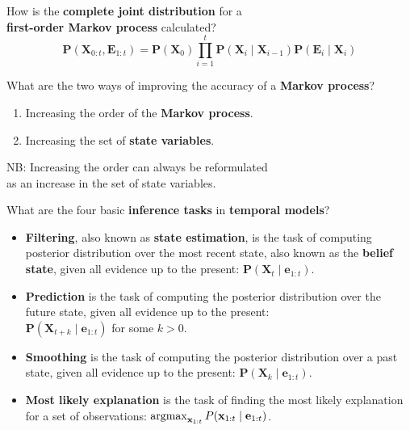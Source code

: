 \begin{flashcard}[Question]{How is the \textbf{complete joint distribution} for a\\\textbf{first-order Markov process} calculated?}
\begin{displaymath}
\mathbf{P}(\mathbf{X}_{0:t}, \mathbf{E}_{1:t}) = \mathbf{P}(\mathbf{X}_0) \prod_{i = 1}^t \mathbf{P}(\mathbf{X}_i \mid \mathbf{X}_{i - 1}) \mathbf{P}(\mathbf{E}_i \mid \mathbf{X}_i)
\end{displaymath}
\end{flashcard}

\begin{flashcard}[Question]{What are the two ways of improving the accuracy of a \textbf{Markov process}?}
\begin{center}
\begin{enumerate}[label=\arabic*.]
\item Increasing the order of the \textbf{Markov process}.
\item Increasing the set of \textbf{state variables}.
\end{enumerate}

\bigskip

NB: Increasing the order can always be reformulated\\as an increase in the set of state variables.
\end{center}
\end{flashcard}

\begin{flashcard}[Question]{What are the four basic \textbf{inference tasks} in \textbf{temporal models}?}
\begin{center}
\begin{itemize}
\item \textbf{Filtering}, also known as \textbf{state estimation}, is the task of computing posterior distribution over the most recent state, also known as the \textbf{belief state}, given all evidence up to the present: $\mathbf{P}(\mathbf{X}_t \mid \mathbf{e}_{1:t})$.
\item \textbf{Prediction} is the task of computing the posterior distribution over the future state, given all evidence up to the present:\\$\mathbf{P}(\mathbf{X}_{t + k} \mid \mathbf{e}_{1:t})$ for some $k > 0$.
\item \textbf{Smoothing} is the task of computing the posterior distribution over a past state, given all evidence up to the present: $\mathbf{P}(\mathbf{X}_k \mid \mathbf{e}_{1:t})$.
\item \textbf{Most likely explanation} is the task of finding the most likely explanation for a set of observations: $\argmax_{\mathbf{x}_{1:t}} P(\mathbf{x}_{1:t} \mid \mathbf{e}_{1:t})$.
\end{itemize}
\end{center}
\end{flashcard}

